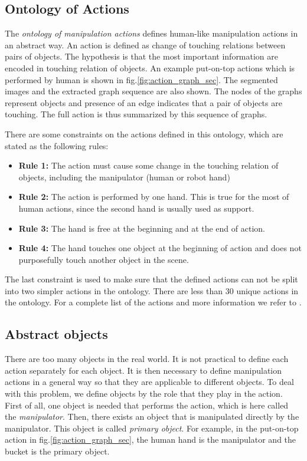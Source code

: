 \subsection{Ontology of Actions}
\label{sec:ontology}
The \textit{ontology of manipulation actions} \cite{TAMD13} defines human-like manipulation actions in an abstract way.
An action is defined as change of touching relations between pairs of objects.
The hypothesis is that the most important information are encoded in touching relation of objects.
An example put-on-top actions which is performed by human is shown in fig.\ref{fig:action_graph_sec}.
The segmented images and the extracted graph sequence are also shown.
The nodes of the graphs represent objects and presence of an edge indicates that a pair of objects are touching.
The full action is thus summarized by this sequence of graphs.

There are some constraints on the actions defined in this ontology, which are stated as the following rules:
\begin{itemize}
 \item \textbf{Rule 1:} The action must cause some change in the touching relation of objects, including the manipulator (human or robot hand)
 \item \textbf{Rule 2:} The action is performed by one hand. This is true for the most of human actions, since the second hand is usually used as support.
 \item \textbf{Rule 3:} The hand is free at the beginning and at the end of action.
 \item \textbf{Rule 4:} The hand touches one object at the beginning of action and does not purposefully touch another object in the scene.
\end{itemize}

The last constraint is used to make sure that the defined actions can not be split into two simpler actions in the ontology.
There are less than 30 unique actions in the ontology.
For a complete list of the actions and more information we refer to \cite{TAMD13}.

\subsection{Abstract objects}

There are too many objects in the real world.
It is not practical to define each action separately for each object.
It is then necessary to define manipulation actions in a general way so that they are applicable to different objects.
To deal with this problem, we define objects by the role that they play in the action.
First of all, one object is needed that performs the action, which is here called the \textit{manipulator}.
Then, there exists an object that is manipulated directly by the manipulator.
This object is called \textit{primary object}.
For example, in the put-on-top action in fig.\ref{fig:action_graph_sec}, the human hand is the manipulator and the bucket is the primary object.

